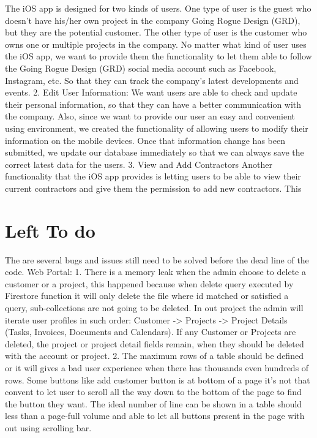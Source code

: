 \documentclass{article}
\newcommand\tab[1][0.5cm]{\hspace*{#1}}
\begin{document}
The iOS app is designed for two kinds of users. One type of user is the guest who doesn't have his/her own project in the company Going Rogue Design (GRD), but they are the potential customer. The other type of user is the customer who owns one or multiple projects in the company. No matter what kind of user uses the iOS app, we want to provide them the functionality to let them able to follow the Going Rogue Design (GRD) social media account such as Facebook, Instagram, etc. So that they can track the company's latest developments and events. \newline
\tab 2. Edit User Information: \newline
\tab We want users are able to check and update their personal information, so that they can have a better communication with the company. Also, since we want to provide our user an easy and convenient using environment, we created the functionality of allowing users to modify their information on the mobile devices. Once that information change has been submitted, we update our database immediately so that we can always save the correct latest data for the users.\newline
\tab 3. View and Add Contractors \newline
\tab Another functionality that the iOS app provides is letting users to be able to view their current contractors and give them the permission to add new contractors. This 

\section{Left To do}
The are several bugs and issues still need to be solved before the dead line of the code. \newline
\tab Web Portal:\newline
\tab 1. There is a memory leak when the admin choose to delete a customer or a project, this happened because when delete query executed by Firestore function it will only delete the file where id matched or satisfied a query, sub-collections are not going to be deleted. In out project the admin will iterate user profiles in such order: Customer -> Projects -> Project Details (Tasks, Invoices, Documents and Calendars). If any Customer or Projects are deleted, the project or project detail fields remain, when they should be deleted with the account or project. \newline
\tab 2. The maximum rows of a table should be defined or it will gives a bad user experience when there has thousands even hundreds of rows. Some buttons like add customer button is at bottom of a page it's not that convent to let user to scroll all the way down to the bottom of the page to find the button they want. The ideal number of line can be shown in a table should  less than a page-full volume and able to let all buttons present in the page with out using scrolling bar.\newline
\end{document}
